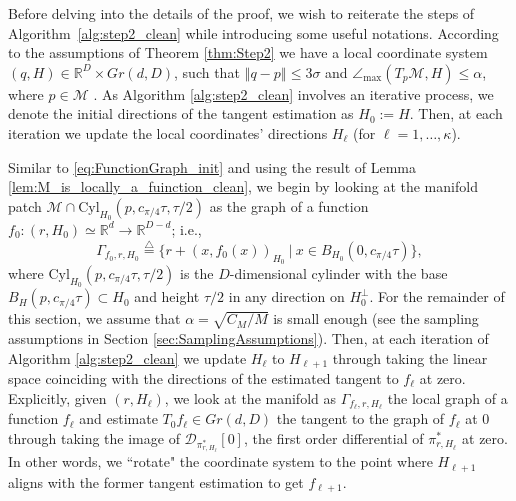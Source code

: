 \documentclass[12pt]{article}
\theoremstyle{remark}
\newcommand{\RR}{\mathbb{R}}
\newcommand{\MM}{\mathcal{M}}
\newcommand{\DD}{\mathcal{D}}
\newcommand{\defeq}{\stackrel{\bigtriangleup}{=}}
\newcommand{\norm}[1]{\left\Vert #1 \right\Vert}
\newcommand{\sM}{{M}}
\begin{document}


Before delving into the details of the proof, we wish to reiterate the steps of Algorithm~\ref{alg:step2_clean} while introducing some useful notations.
According to the assumptions of Theorem \ref{thm:Step2} we have a local coordinate system $(q, H)\in \RR^D\times Gr(d, D)$, such that $ \norm{q-p} \leq 3 \sigma $ and $\angle_\textrm{max}(T_p\MM, H) \leq \alpha$, where $p\in \MM$ .
As Algorithm \ref{alg:step2_clean} involves an iterative process, we denote the initial directions of the tangent estimation as $H_0 := H$.
Then, at each iteration we update the local coordinates' directions $H_\ell$ (for $\ell=1, \ldots, \kappa$). 

Similar to \eqref{eq:FunctionGraph_init} and using the result of Lemma \ref{lem:M_is_locally_a_fuinction_clean}, we begin by looking at the manifold patch $\MM \cap \textrm{Cyl}_{H_0}(p,c_{\pi/4}\tau,\tau/2)$ as the graph of a function $f_{0}:(r,H_0) \simeq\RR^d\to\RR^{D-d}$; i.e., 
\begin{equation}
	\Gamma_{f_{0}, r,H_0} \defeq \{r + (x, f_{0}(x))_{H_0} ~|~ x\in B_{H_0}(0, c_{\pi/4}\tau)\}  
	,\end{equation}
where $\textrm{Cyl}_{H_0}(p,c_{\pi/4}\tau, \tau/2)$ is the $D$-dimensional cylinder with the base $B_H(p, c_{\pi/4}\tau)\subset H_0$ and height $\tau/2$ in any direction on $H_0^\perp$. 
For the remainder of this section, we assume that $ \alpha = \sqrt{C_\sM/M} $ is small enough (see the sampling assumptions in Section \ref{sec:SamplingAssumptions}).
Then, at each iteration of Algorithm \ref{alg:step2_clean} we update $H_\ell$ to $H_{\ell + 1}$ through taking the linear space coinciding with the directions of the estimated tangent to $f_{\ell}$ at zero. 
Explicitly, given $(r, H_{\ell})$, we look at the manifold as $\Gamma_{f_{\ell}, r, H_{\ell}}$ the local graph of a function $f_{\ell}$ and estimate $T_0 f_{\ell} \in Gr(d, D)$ the tangent to the graph of $f_{\ell}$ at $0$ through taking the image of $\DD_{\pi^*_{r, H_{\ell}}}[0]$, the first order differential of $\pi^*_{r, H_{\ell }}$ at zero.
In other words, we ``rotate" the coordinate system to the point where $H_{\ell+1}$ aligns with the former tangent estimation to get $f_{\ell+1}$. 
\end{document}
